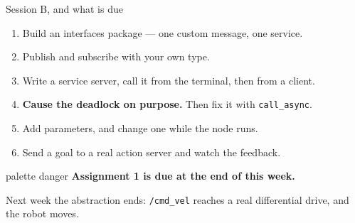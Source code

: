 \documentclass[aspectratio=169]{beamer}
\begin{document}
\begin{frame}{Session B, and what is due}
  \begin{enumerate}\small
    \item Build an interfaces package --- one custom message, one service.
    \item Publish and subscribe with your own type.
    \item Write a service server, call it from the terminal, then from a client.
    \item \textbf{Cause the deadlock on purpose.} Then fix it with \texttt{call\_async}.
    \item Add parameters, and change one while the node runs.
    \item Send a goal to a real action server and watch the feedback.
  \end{enumerate}

  \vspace{0.7em}
  \begin{beamercolorbox}[sep=6pt,center,rounded=true]{palette danger}
    \small \textbf{Assignment 1 is due at the end of this week.}
  \end{beamercolorbox}

  \vspace{0.4em}
  \centering\footnotesize
  Next week the abstraction ends: \texttt{/cmd\_vel} reaches a real differential drive, and
  the robot moves.
\end{frame}
\end{document}
